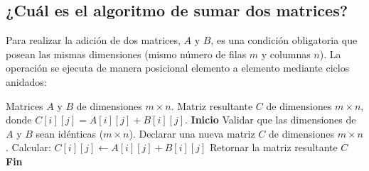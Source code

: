 \documentclass[12pt]{article}
\begin{document}
\subsection{¿Cuál es el algoritmo de sumar dos matrices?}
Para realizar la adición de dos matrices, $A$ y $B$, es una condición obligatoria que posean las mismas dimensiones (mismo número de filas $m$ y columnas $n$). La operación se ejecuta de manera posicional elemento a elemento mediante ciclos anidados:
\begin{algorithm}[H]
\caption{Suma de dos matrices}
\begin{algorithmic}[1]
    \Require Matrices $A$ y $B$ de dimensiones $m \times n$.
    \Ensure Matriz resultante $C$ de dimensiones $m \times n$, donde $C[i][j] = A[i][j] + B[i][j]$.
    \State \textbf{Inicio}
    \State Validar que las dimensiones de $A$ y $B$ sean idénticas ($m \times n$).
    \State Declarar una nueva matriz $C$ de dimensiones $m \times n$.
            \State Calcular: $C[i][j] \leftarrow A[i][j] + B[i][j]$
        \EndFor
    \EndFor
    \State Retornar la matriz resultante $C$
    \State \textbf{Fin}
\end{algorithmic}
\end{algorithm}
\end{document}

